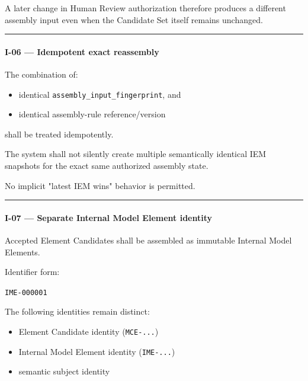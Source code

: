 A later change in Human Review authorization therefore produces a different assembly input even when the Candidate Set itself remains unchanged.

\begin{center}\rule{0.5\linewidth}{0.5pt}\end{center}

\hypertarget{i-06--idempotent-exact-reassembly}{%
\paragraph{I-06 --- Idempotent exact reassembly}\label{i-06--idempotent-exact-reassembly}}

The combination of:

\begin{itemize}
\tightlist
\item
  identical \texttt{assembly\_input\_fingerprint}, and
\item
  identical assembly-rule reference/version
\end{itemize}

shall be treated idempotently.

The system shall not silently create multiple semantically identical IEM snapshots for the exact same authorized assembly state.

No implicit "latest IEM wins" behavior is permitted.

\begin{center}\rule{0.5\linewidth}{0.5pt}\end{center}

\hypertarget{i-07--separate-internal-model-element-identity}{%
\paragraph{I-07 --- Separate Internal Model Element identity}\label{i-07--separate-internal-model-element-identity}}

Accepted Element Candidates shall be assembled as immutable Internal Model Elements.

Identifier form:

\texttt{IME-000001}

The following identities remain distinct:

\begin{itemize}
\tightlist
\item
  Element Candidate identity (\texttt{MCE-...})
\item
  Internal Model Element identity (\texttt{IME-...})
\item
  semantic subject identity
\end{itemize}

